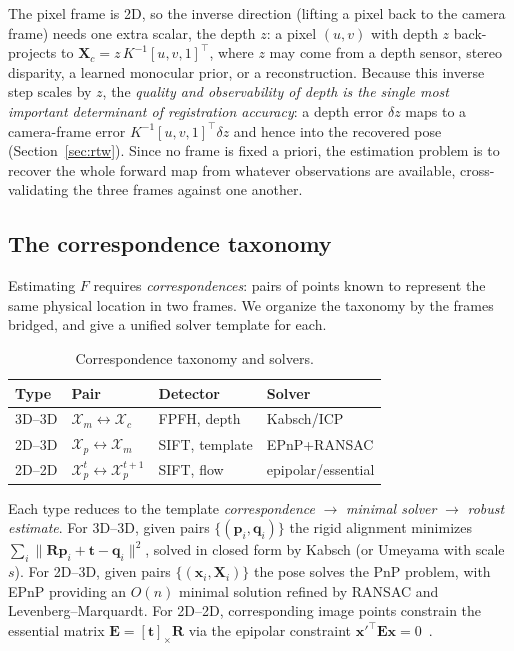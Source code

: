 \documentclass[9pt,twoside,web]{ieeecolor2}
\begin{document}
The pixel frame is 2D, so the inverse direction (lifting a pixel back to the camera frame) needs one extra scalar, the depth $z$: a pixel $(u,v)$ with depth $z$ back-projects to $\mathbf{X}_{c}=z\,K^{-1}[u,v,1]^{\top}$, where $z$ may come from a depth sensor, stereo disparity, a learned monocular prior, or a reconstruction. Because this inverse step scales by $z$, the \emph{quality and observability of depth is the single most important determinant of registration accuracy}: a depth error $\delta z$ maps to a camera-frame error $K^{-1}[u,v,1]^{\top}\delta z$ and hence into the recovered pose (Section~\ref{sec:rtw}). Since no frame is fixed a priori, the estimation problem is to recover the whole forward map from whatever observations are available, cross-validating the three frames against one another.

\subsection{The correspondence taxonomy}\label{sec:corr}
Estimating $F$ requires \emph{correspondences}: pairs of points known to represent the same physical location in two frames. We organize the taxonomy by the frames bridged, and give a unified solver template for each.

\begin{table}[t]
\centering
\caption{Correspondence taxonomy and solvers.}
\label{tab:taxonomy}
\begin{tabular}{llll}
\toprule
Type & Pair & Detector & Solver \\
\midrule
3D--3D & $\mathcal{X}_{m}\!\leftrightarrow\!\mathcal{X}_{c}$ & FPFH, depth & Kabsch/ICP \\
2D--3D & $\mathcal{X}_{p}\!\leftrightarrow\!\mathcal{X}_{m}$ & SIFT, template & EPnP+RANSAC \\
2D--2D & $\mathcal{X}_{p}^{t}\!\leftrightarrow\!\mathcal{X}_{p}^{t+1}$ & SIFT, flow & epipolar/essential \\
\bottomrule
\end{tabular}
\end{table}

Each type reduces to the template \emph{correspondence} $\to$ \emph{minimal solver} $\to$ \emph{robust estimate}. For 3D--3D, given pairs $\{(\mathbf{p}_{i},\mathbf{q}_{i})\}$ the rigid alignment minimizes $\sum_{i}\|\mathbf{R}\mathbf{p}_{i}+\mathbf{t}-\mathbf{q}_{i}\|^{2}$, solved in closed form by Kabsch (or Umeyama with scale $s$). For 2D--3D, given pairs $\{(\mathbf{x}_{i},\mathbf{X}_{i})\}$ the pose solves the PnP problem, with EPnP providing an $O(n)$ minimal solution refined by RANSAC and Levenberg--Marquardt. For 2D--2D, corresponding image points constrain the essential matrix $\mathbf{E}=[\mathbf{t}]_{\times}\mathbf{R}$ via the epipolar constraint $\mathbf{x}'^{\top}\mathbf{E}\mathbf{x}=0$~\cite{longuet1981,hartley2003mvg}.
\end{document}
